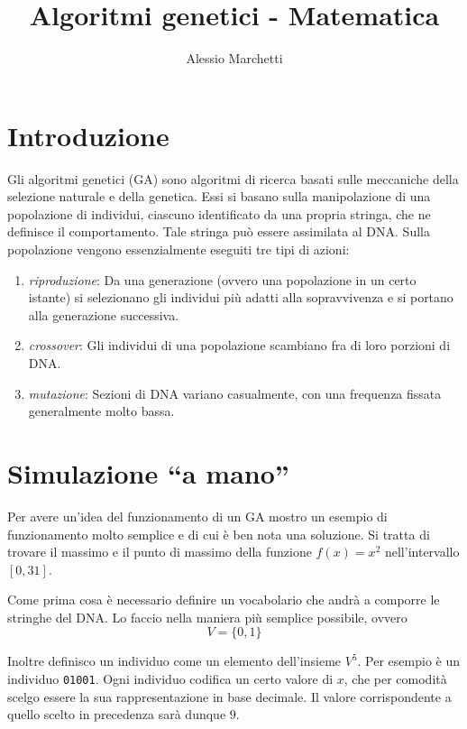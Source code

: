 \documentclass[a4paper, 11pt]{article}
\title{\myfont Algoritmi genetici - Matematica}
\author{Alessio Marchetti}
\date{}
\newcommand{\code}{\texttt}
\begin{document}
\maketitle

\section{Introduzione}

Gli algoritmi genetici (GA) sono algoritmi di ricerca basati sulle meccaniche
della selezione naturale e della genetica. Essi si basano sulla manipolazione di
una popolazione di individui, ciascuno identificato da una propria stringa, che
ne definisce il comportamento. Tale stringa può essere assimilata al DNA. Sulla
popolazione vengono essenzialmente eseguiti tre tipi di azioni:
\begin{enumerate}
    \item
    \textit{riproduzione}: Da una generazione (ovvero una popolazione in un
        certo istante) si selezionano gli individui più adatti alla
        sopravvivenza e si portano alla generazione successiva.
    \item
    \textit{crossover}: Gli individui di una popolazione scambiano fra di loro
        porzioni di DNA.
    \item
    \textit{mutazione}: Sezioni di DNA variano casualmente, con una frequenza
        fissata generalmente molto bassa.
\end{enumerate}



\section{Simulazione ``a mano''}

Per avere un'idea del funzionamento di un GA mostro un esempio di funzionamento
molto semplice e di cui è ben nota una soluzione. Si tratta di trovare il
massimo e il punto di massimo della funzione $f(x)=x^2$ nell'intervallo
$[0,31]$.

Come prima cosa è necessario definire un vocabolario che andrà a comporre le
stringhe del DNA. Lo faccio nella maniera più semplice possibile, ovvero
$$V=\{0,1\}$$

Inoltre definisco un individuo come un elemento dell'insieme $V^5$. Per esempio
è un individuo \code{01001}. Ogni individuo codifica un certo valore di $x$, che
per comodità scelgo essere la sua rappresentazione in base decimale. Il valore
corrispondente a quello scelto in precedenza sarà dunque $9$.
\end{document}
